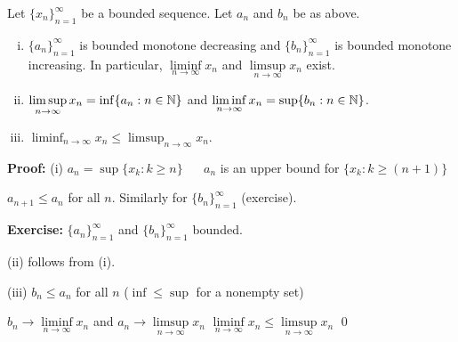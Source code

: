 \documentclass[10pt,aspectratio=149]{beamer}
\begin{document}
\begin{frame}

\begin{proposition}
Let $\{ x_n \}_{n=1}^\infty$ be a bounded sequence.  Let $a_n$ and $b_n$ be
as above.
\pause
\begin{enumerate}[(i)]
\item
$\{ a_n \}_{n=1}^\infty$ is bounded monotone decreasing
and $\{ b_n \}_{n=1}^\infty$ is bounded monotone increasing.  In particular,
$\liminf\limits_{n\to\infty} x_n$ and $\limsup\limits_{n\to\infty} x_n$ exist.
\item\pause
$\displaystyle \limsup_{n \to \infty} x_n = \inf \{ a_n : n \in {\mathbb{N}} \}$
and
$\displaystyle \liminf_{n \to \infty} x_n = \sup \{ b_n : n \in {\mathbb{N}} \}$.
\item\pause
$\displaystyle \liminf_{n \to \infty} x_n \leq
\limsup_{n \to \infty} x_n$.
\end{enumerate}
\end{proposition}

\pause

\textbf{Proof:}
(i) $a_n = \sup \{ x_k : k \geq n \}$ ~\thus~ $a_n$ is an upper bound for
$\{ x_k : k \geq (n+1) \}$

\pause

\thus \quad $a_{n+1} \leq a_n$ for all $n$.
\pause
\quad
Similarly for $\{ b_n \}_{n=1}^\infty$ (exercise).

\pause
\medskip

\textbf{Exercise:}
$\{a_n \}_{n=1}^\infty$ and $\{ b_n \}_{n=1}^\infty$ bounded.

\pause
\medskip

(ii) follows from (i).

\pause
\medskip

(iii)
$b_n \leq a_n$ for all $n$ \quad ($\inf \leq \sup$ for a nonempty set)

\pause
$b_n \to \liminf\limits_{n\to\infty} x_n$ \quad
and \quad $a_n \to \limsup\limits_{n\to\infty} x_n$
\pause
\wthus $\liminf\limits_{n\to\infty} x_n \leq \limsup\limits_{n\to\infty} x_n$ \qed

\end{frame}
\end{document}

